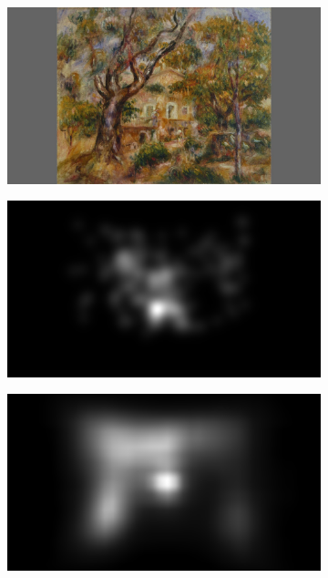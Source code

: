 \begin{figure}[ht]
    \centering
    \begin{subfigure}{.24\textwidth}
        \includegraphics[width=\linewidth]{datas/samresnet/stimulus_La_Ferme_des_Collettes_Renoir_1908.png}
        \caption{}
    \end{subfigure}
    \begin{subfigure}{.24\textwidth}
        \includegraphics[width=\linewidth]{datas/samresnet/human_La_Ferme_des_Collettes_Renoir_1908.png}
        \caption{}
    \end{subfigure}
    \begin{subfigure}{.24\textwidth}
        \includegraphics[width=\linewidth]{datas/samresnet/orig_La_Ferme_des_Collettes_Renoir_1908.png}

\end{subfigure}
\end{figure}

